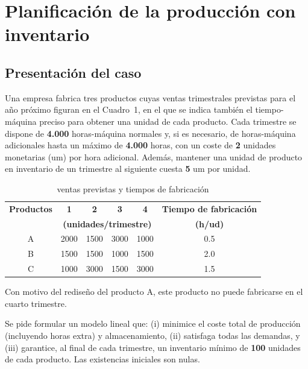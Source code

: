 \section{Planificación de la producción con inventario}



\subsection{Presentación del caso}
Una empresa fabrica tres productos cuyas ventas trimestrales previstas para el año próximo figuran en el Cuadro~1, en el que se indica también el tiempo-máquina preciso para obtener una unidad de cada producto. Cada trimestre se dispone de \textbf{4.000} horas-máquina normales y, si es necesario, de horas-máquina adicionales hasta un máximo de \textbf{4.000} horas, con un coste de \textbf{2} unidades monetarias (um) por hora adicional. Además, mantener una unidad de producto en inventario de un trimestre al siguiente cuesta \textbf{5} um por unidad.\par

\begin{table}[!h]
\centering
\caption{ventas previstas y tiempos de fabricación}
\begin{tabular}{c|cccc|c}
\hline
\textbf{Productos} & \textbf{1} & \textbf{2} & \textbf{3} & \textbf{4} & \textbf{Tiempo de fabricación} \\
 & \multicolumn{4}{c|}{\textbf{(unidades/trimestre)}} & \textbf{(h/ud)} \\
\hline
A & 2000 & 1500 & 3000 & 1000 & 0.5 \\
B & 1500 & 1500 & 1000 & 1500 & 2.0 \\
C & 1000 & 3000 & 1500 & 3000 & 1.5 \\
\hline
\end{tabular}
\label{tab:cuadro1}
\end{table}

Con motivo del rediseño del producto A, este producto no puede fabricarse en el cuarto trimestre.%

Se pide formular un modelo lineal que: (i) minimice el coste total de producción (incluyendo horas extra) y almacenamiento, (ii) satisfaga todas las demandas, y (iii) garantice, al final de cada trimestre, un inventario mínimo de \textbf{100} unidades de cada producto. Las existencias iniciales son nulas. 





